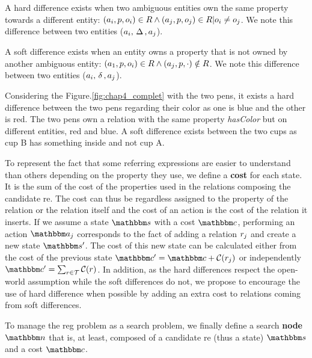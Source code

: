 \begin{definition}
A hard difference exists when two ambiguous entities own the same property towards a different entity: $(a_i, p, o_i) \in R \land (a_j, p, o_j) \in R | o_i \neq o_j$. We note this difference between two entities ($a_i, \,\Delta\,, a_j$).
\end{definition}

\begin{definition}
A soft difference exists when an entity owns a property that is not owned by another ambiguous entity: $(a_1, p, o_i) \in R \land (a_j, p, \cdot) \notin R$. We note this difference between two entities ($a_i, \,\delta\,, a_j$).
\end{definition}

Considering the Figure.\ref{fig:chap4_complet} with the two pens, it exists a hard difference between the two pens regarding their color as one is blue and the other is red. The two pens own a relation with the same property \textit{hasColor} but on different entities, red and blue. A soft difference exists between the two cups as cup B has something inside and not cup A.

To represent the fact that some referring expressions are easier to understand than others depending on the property they use, we define a \textbf{cost} for each state. It is the sum of the cost of the properties used in the relations composing the candidate \acrshort{re}. The cost can thus be regardless assigned to the property of the relation or the relation itself and the cost of an action is the cost of the relation it inserts. If we assume a state $\state$ with a cost $\cost$, performing an action $\action_j$ corresponds to the fact of adding a relation $r_j$ and create a new state $\state'$. The cost of this new state can be calculated either from the cost of the previous state $\cost' = \cost + \costfunc(\relation_j)$ or independently $\cost' = \sum_{\relation \in \mathcal{T}} \costfunc(\relation)$. In addition, as the hard differences respect the open-world assumption while the soft differences do not, we propose to encourage the use of hard difference when possible by adding an extra cost to relations coming from soft differences.

To manage the \acrshort{reg} problem as a search problem, we finally define a search \textbf{node} $\node$ that is, at least, composed of a candidate \acrshort{re} (thus a state) $\state$ and a cost $\cost$.

